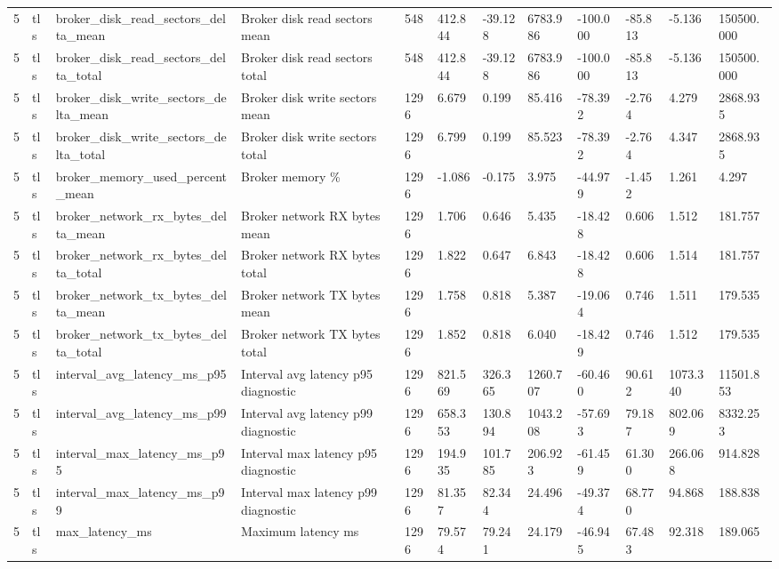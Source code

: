 \begin{longtable}{llllllllllll}
5 & tls & broker\_disk\_read\_sectors\_delta\_mean & Broker disk read sectors mean & 548 & 412.844 & -39.128 & 6783.986 & -100.000 & -85.813 & -5.136 & 150500.000 \\
5 & tls & broker\_disk\_read\_sectors\_delta\_total & Broker disk read sectors total & 548 & 412.844 & -39.128 & 6783.986 & -100.000 & -85.813 & -5.136 & 150500.000 \\
5 & tls & broker\_disk\_write\_sectors\_delta\_mean & Broker disk write sectors mean & 1296 & 6.679 & 0.199 & 85.416 & -78.392 & -2.764 & 4.279 & 2868.935 \\
5 & tls & broker\_disk\_write\_sectors\_delta\_total & Broker disk write sectors total & 1296 & 6.799 & 0.199 & 85.523 & -78.392 & -2.764 & 4.347 & 2868.935 \\
5 & tls & broker\_memory\_used\_percent\_mean & Broker memory \% & 1296 & -1.086 & -0.175 & 3.975 & -44.979 & -1.452 & 1.261 & 4.297 \\
5 & tls & broker\_network\_rx\_bytes\_delta\_mean & Broker network RX bytes mean & 1296 & 1.706 & 0.646 & 5.435 & -18.428 & 0.606 & 1.512 & 181.757 \\
5 & tls & broker\_network\_rx\_bytes\_delta\_total & Broker network RX bytes total & 1296 & 1.822 & 0.647 & 6.843 & -18.428 & 0.606 & 1.514 & 181.757 \\
5 & tls & broker\_network\_tx\_bytes\_delta\_mean & Broker network TX bytes mean & 1296 & 1.758 & 0.818 & 5.387 & -19.064 & 0.746 & 1.511 & 179.535 \\
5 & tls & broker\_network\_tx\_bytes\_delta\_total & Broker network TX bytes total & 1296 & 1.852 & 0.818 & 6.040 & -18.429 & 0.746 & 1.512 & 179.535 \\
5 & tls & interval\_avg\_latency\_ms\_p95 & Interval avg latency p95 diagnostic & 1296 & 821.569 & 326.365 & 1260.707 & -60.460 & 90.612 & 1073.340 & 11501.853 \\
5 & tls & interval\_avg\_latency\_ms\_p99 & Interval avg latency p99 diagnostic & 1296 & 658.353 & 130.894 & 1043.208 & -57.693 & 79.187 & 802.069 & 8332.253 \\
5 & tls & interval\_max\_latency\_ms\_p95 & Interval max latency p95 diagnostic & 1296 & 194.935 & 101.785 & 206.923 & -61.459 & 61.300 & 266.068 & 914.828 \\
5 & tls & interval\_max\_latency\_ms\_p99 & Interval max latency p99 diagnostic & 1296 & 81.357 & 82.344 & 24.496 & -49.374 & 68.770 & 94.868 & 188.838 \\
5 & tls & max\_latency\_ms & Maximum latency ms & 1296 & 79.574 & 79.241 & 24.179 & -46.945 & 67.483 & 92.318 & 189.065 \\

\end{longtable}
